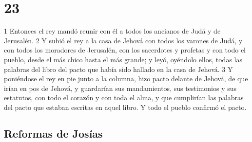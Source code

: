 \chapter{23}

1 Entonces el rey mandó reunir con él a todos los ancianos de Judá y de Jerusalén.
2 Y subió el rey a la casa de Jehová con todos los varones de Judá, y con todos los moradores de Jerusalén, con los sacerdotes y profetas y con todo el pueblo, desde el más chico hasta el más grande; y leyó, oyéndolo ellos, todas las palabras del libro del pacto que había sido hallado en la casa de Jehová.
3 Y poniéndose el rey en pie junto a la columna, hizo pacto delante de Jehová, de que irían en pos de Jehová, y guardarían sus mandamientos, sus testimonios y sus estatutos, con todo el corazón y con toda el alma, y que cumplirían las palabras del pacto que estaban escritas en aquel libro. Y todo el pueblo confirmó el pacto.

\section*{Reformas de Josías}


